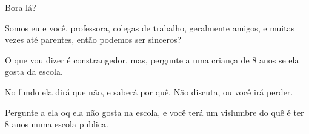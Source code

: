 Bora lá?

Somos eu e você, professora, colegas de trabalho, geralmente amigos, e muitas vezes até parentes, então podemos ser sinceros?

O que vou dizer é constrangedor, mas, pergunte a uma criança de 8 anos se ela gosta da escola.

No fundo ela dirá que não, e saberá por quê. Não discuta, ou você irá perder.

Pergunte a ela oq ela não gosta na escola, e você terá um vislumbre do quê é ter 8 anos numa escola publica.
